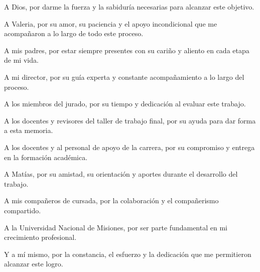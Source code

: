 \documentclass[
    11pt,
    spanish,
    singlespacing,
    parskip,
    headsepline,
    bookmarks=true,
    unicode=true,
    pdftoolbar=true,
    pdfmenubar=true,
    pdffitwindow=false,
    colorlinks=true,
    linkcolor=blue,
    citecolor=blue,
    urlcolor=blue
]{MastersDoctoralThesis}
\def\textbf#1{#1}%
\begin{document}
\begin{acknowledgements}
  \vspace{1.5cm}
  A Dios, por darme la fuerza y la sabiduría necesarias para alcanzar este objetivo.

  A Valeria, por su amor, su paciencia y el apoyo incondicional que me
  acompañaron a lo largo de todo este proceso.

  A mis padres, por estar siempre presentes con su cariño y aliento en cada etapa
  de mi vida.

  A mi director, por su guía experta y constante acompañamiento a lo largo del
  proceso.

  A los miembros del jurado, por su tiempo y dedicación al evaluar este trabajo.

  A los docentes y revisores del taller de trabajo final, por su ayuda para dar
  forma a esta memoria.

  A los docentes y al personal de apoyo de la carrera, por su compromiso y
  entrega en la formación académica.

  A Matías, por su amistad, su orientación y aportes durante el desarrollo del trabajo.

  A mis compañeros de cursada, por la colaboración y el compañerismo compartido.

  A la Universidad Nacional de Misiones, por ser parte fundamental en mi
  crecimiento profesional.

  Y a mí mismo, por la constancia, el esfuerzo y la dedicación que me permitieron
  alcanzar este logro.

\end{acknowledgements}


\tableofcontents
\listoffigures
\listoftables



\end{document}
